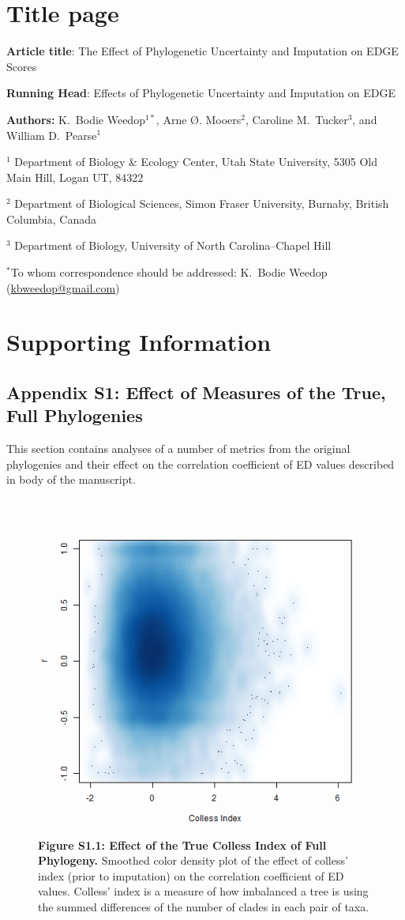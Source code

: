 \documentclass[10pt,english]{article}
\begin{document}
\section*{Title page}

\textbf{Article title}: The Effect of Phylogenetic Uncertainty and Imputation on EDGE Scores

\textbf{Running Head}: Effects of Phylogenetic Uncertainty and Imputation on EDGE

\textbf{Authors:} K.\ Bodie Weedop$^{1*}$, Arne \O. Mooers$^2$, Caroline M.\ Tucker$^3$, and William D.\ Pearse$^{1}$\

$^1$ Department of Biology \& Ecology Center, Utah State University,
5305 Old Main Hill, Logan UT, 84322

$^2$ Department of Biological Sciences, Simon Fraser University, Burnaby,
British Columbia, Canada

$^3$ Department of Biology, University of North Carolina–Chapel Hill

$^*$To whom correspondence should be addressed: K.\ Bodie Weedop (\url{kbweedop@gmail.com})

\clearpage
 
\section*{Supporting Information}

\subsection*{Appendix S1: Effect of Measures of the True, Full Phylogenies}

This section contains analyses of a number of metrics from the original
phylogenies and their effect on the correlation coefficient of ED values
described in body of the manuscript.

\begin{figure}[!ht]
  \center
  \includegraphics[width=.5\textwidth]{../figures/trueColless.png}
  \caption*{\textbf{Figure S1.1: Effect of the True Colless Index of Full Phylogeny.} 
  Smoothed color density plot of the effect of colless' index (prior to
  imputation) on the correlation coefficient of ED values. Colless' index is a
  measure of how imbalanced a tree is using the summed differences of the number
  of clades in each pair of taxa.}
\end{figure}
\end{document}
